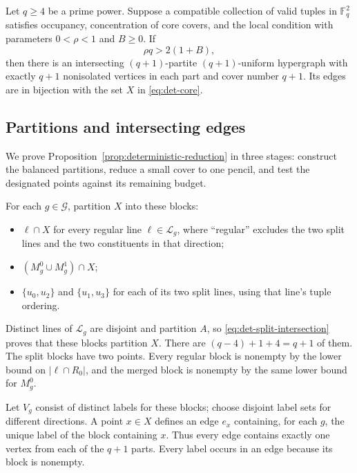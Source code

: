 \begin{proposition}
\label{prop:deterministic-reduction}
Let $q\geq4$ be a prime power.  Suppose a compatible collection of valid
tuples in $\mathbb F_q^2$ satisfies occupancy, concentration of core
covers, and the local condition with parameters $0<\rho<1$ and
$B\geq0$.  If
\begin{equation}
 \rho q>2(1+B),
 \label{eq:det-size-condition}
\end{equation}
then there is an intersecting $(q+1)$-partite $(q+1)$-uniform hypergraph
with exactly $q+1$ nonisolated vertices in each part and cover number
$q+1$.  Its edges are in bijection with the set $X$ in
\eqref{eq:det-core}.
\end{proposition}

\subsection{Partitions and intersecting edges}

We prove Proposition~\ref{prop:deterministic-reduction} in three stages:
construct the balanced partitions, reduce a small cover to one pencil,
and test the designated points against its remaining budget.

For each $g\in\mathcal G$, partition $X$ into these blocks:
\begin{itemize}
 \item $\ell\cap X$ for every regular line $\ell\in\mathcal L_g$,
 where ``regular'' excludes the two split lines and the two constituents
 in that direction;
 \item $(M_g^0\cup M_g^1)\cap X$;
 \item $\{u_0,u_2\}$ and $\{u_1,u_3\}$ for each of its two split lines,
 using that line's tuple ordering.
\end{itemize}
Distinct lines of $\mathcal L_g$ are disjoint and partition $A$, so
\eqref{eq:det-split-intersection} proves that these blocks partition $X$.
There are $(q-4)+1+4=q+1$ of them.  The split blocks have two points.
Every regular block is nonempty by the lower bound on $|\ell\cap R_0|$,
and the merged block is nonempty by the same lower bound for $M_g^0$.

Let $V_g$ consist of distinct labels for these blocks; choose disjoint
label sets for different directions.  A point $x\in X$ defines an edge
$e_x$ containing, for each $g$, the unique label of the block containing
$x$.  Thus every edge contains exactly one vertex from each of the $q+1$
parts.  Every label occurs in an edge because its block is nonempty.

